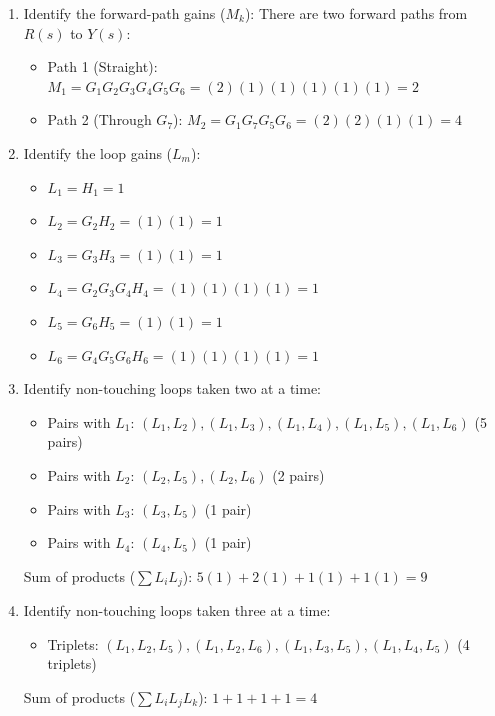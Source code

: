 \documentclass[11pt]{article}
\begin{document}
\begin{enumerate}[label=(\alph*), itemindent=*, leftmargin=*, nolistsep]
    \item Identify the forward-path gains ($M_k$):
    There are two forward paths from $R(s)$ to $Y(s)$:
    \begin{itemize}
        \item Path 1 (Straight): \( M_1 = G_1 G_2 G_3 G_4 G_5 G_6 = (2)(1)(1)(1)(1)(1) = 2 \)
        \item Path 2 (Through $G_7$): \( M_2 = G_1 G_7 G_5 G_6 = (2)(2)(1)(1) = 4 \)
    \end{itemize}

    \item Identify the loop gains ($L_m$):
    \begin{itemize}
        \item $L_1 = H_1 = 1$
        \item $L_2 = G_2 H_2 = (1)(1) = 1$
        \item $L_3 = G_3 H_3 = (1)(1) = 1$
        \item $L_4 = G_2 G_3 G_4 H_4 = (1)(1)(1)(1) = 1$
        \item $L_5 = G_6 H_5 = (1)(1) = 1$
        \item $L_6 = G_4 G_5 G_6 H_6 = (1)(1)(1)(1) = 1$
    \end{itemize}

    \item Identify non-touching loops taken two at a time:
    \begin{itemize}
        \item Pairs with $L_1$: $(L_1,L_2), (L_1,L_3), (L_1,L_4), (L_1,L_5), (L_1,L_6)$ (5 pairs)
        \item Pairs with $L_2$: $(L_2,L_5), (L_2,L_6)$ (2 pairs)
        \item Pairs with $L_3$: $(L_3,L_5)$ (1 pair)
        \item Pairs with $L_4$: $(L_4,L_5)$ (1 pair)
    \end{itemize}
    Sum of products ($\sum L_i L_j$): $5(1) + 2(1) + 1(1) + 1(1) = 9$

    \item Identify non-touching loops taken three at a time:
    \begin{itemize}
        \item Triplets: $(L_1, L_2, L_5), (L_1, L_2, L_6), (L_1, L_3, L_5), (L_1, L_4, L_5)$ (4 triplets)
    \end{itemize}
    Sum of products ($\sum L_i L_j L_k$): $1+1+1+1 = 4$


\end{enumerate}
\end{document}
